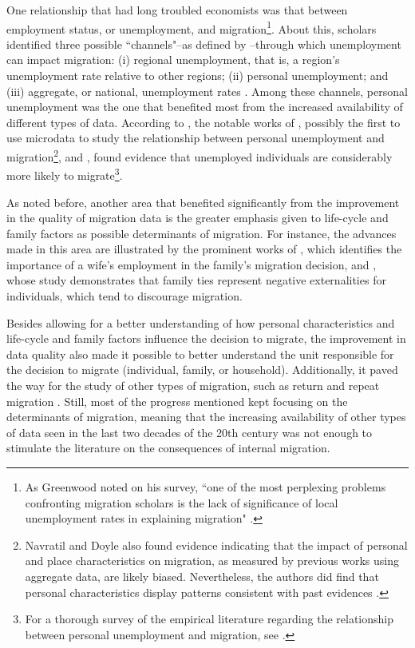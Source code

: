 One relationship that had long troubled economists was that between employment status, or unemployment, and migration\footnote{As Greenwood noted on his survey, ``one of the most perplexing problems confronting migration scholars is the lack of significance of local unemployment rates in explaining migration" \citep[p. 411]{greenwood_research_1975}.}. About this, scholars identified three possible ``channels"--as defined by \cite{greenwood_internal_1997}--through which unemployment can impact migration: (i) regional unemployment, that is, a region's unemployment rate relative to other regions; (ii) personal unemployment; and (iii) aggregate, or national, unemployment rates \citep{greenwood_internal_1997}. Among these channels, personal unemployment was the one that benefited most from the increased availability of different types of data. According to \cite{herzog_migration_1993}, the notable works of \cite{navratil_socioeconomic_1977}, possibly the first to use microdata to study the relationship between personal unemployment and migration\footnote{Navratil and Doyle also found evidence indicating that the impact of personal and place characteristics on migration, as measured by previous works using aggregate data, are likely biased. Nevertheless, the authors did find that personal characteristics display patterns consistent with past evidences \citep{navratil_socioeconomic_1977}.}, and \cite{davanzo_does_1978}, found evidence that unemployed individuals are considerably more likely to migrate\footnote{For a thorough survey of the empirical literature regarding the relationship between personal unemployment and migration, see \cite{herzog_migration_1993}.}.

As noted before, another area that benefited significantly from the improvement in the quality of migration data is the greater emphasis given to life-cycle and family factors as possible determinants of migration. For instance, the advances made in this area are illustrated by the prominent works of \cite{sandell_women_1977}, which identifies the importance of a wife's employment in the family's migration decision, and \cite{mincer_family_1978}, whose study demonstrates that family ties represent negative externalities for individuals, which tend to discourage migration. 

Besides allowing for a better understanding of how personal characteristics and life-cycle and family factors influence the decision to migrate, the improvement in data quality also made it possible to better understand the unit responsible for the decision to migrate (individual, family, or household). Additionally, it paved the way for the study of other types of migration, such as return and repeat migration \citep{greenwood_human_1985, greenwood_internal_1997}. Still, most of the progress mentioned kept focusing on the determinants of migration, meaning that the increasing availability of other types of data seen in the last two decades of the 20th century was not enough to stimulate the literature on the consequences of internal migration.

